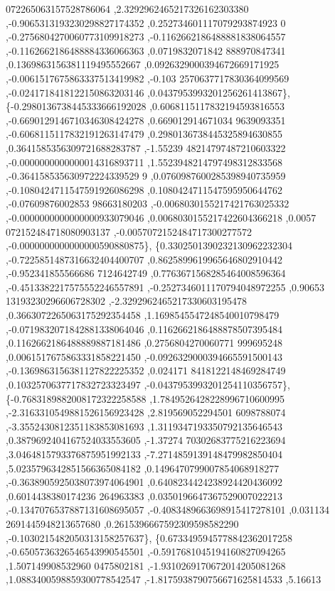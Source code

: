 \begin{DoxyCode}
      072265063157528786064 ,2.3292962465217326162303380 ,-0.9065313193230298827174352 ,0.252734601117079293874923
      0 ,-0.2756804270060773109918273 ,-0.1162662186488881838064557 ,-0.1162662186488884336066363 ,0.0719832071842
      888970847341 ,0.1369863156381119495552667 ,0.0926329000394672669171925 ,-0.0061517675863337513419982 ,-0.103
      2570637717830364099569 ,-0.0241718418122150863203146 ,0.0437953993201256261413867\},
\{-0.2980136738445333666192028 ,0.6068115117832194593816553 ,-0.6690129146710346308424278 ,0.669012914671034
      9639093351 ,-0.6068115117832191263147479 ,0.2980136738445325894630855 ,0.3641585356309721688283787 ,-1.55239
      48214797487210603322 ,-0.0000000000000014316893711 ,1.5523948214797498312833568 ,-0.364158535630972224339529
      9 ,0.0760987600285398940735959 ,-0.1080424711547591926086298 ,0.1080424711547595950644762 ,-0.07609876002853
      98663180203 ,-0.0068030155217421763025332 ,-0.0000000000000000933079046 ,0.0068030155217422604366218 ,0.0057
      072152484718080903137 ,-0.0057072152484717300277572 ,-0.0000000000000000590880875\},
\{0.3302501390232130962232304 ,-0.7225851487316632404400707 ,0.8625899619965646802910442 ,-0.952341855566686
      7124642749 ,0.7763671568285464008596364 ,-0.4513382217575552246557891 ,-0.2527346011170794048972255 ,0.90653
      13193230296606728302 ,-2.3292962465217330603195478 ,0.3663072265063175292354458 ,1.1698545547248540010798479
       ,-0.0719832071842881338064046 ,0.1162662186488878507395484 ,0.1162662186488889887181486 ,0.2756804270060771
      999695248 ,0.0061517675863331858221450 ,-0.0926329000394665591500143 ,-0.1369863156381127822225352 ,0.024171
      8418122148469284749 ,0.1032570637717832723323497 ,-0.0437953993201254110356757\},
\{-0.7683189882008172322258588 ,1.7849526428228996710600995 ,-2.3163310549881526156923428 ,2.819569052294501
      6098788074 ,-3.3552430812351183853081693 ,1.3119347193350792135646543 ,0.3879692404167524033553605 ,-1.37274
      70302683775216223694 ,3.0464815793376875951992133 ,-7.2714859139148479982850404 ,5.0235796342851566365084182
       ,0.1496470799007854068918277 ,-0.3638905925038073974064901 ,0.6408234424238924420436092 ,0.6014438380174236
      264963383 ,0.0350196647367529007022213 ,-0.1347076537887131608695057 ,-0.4083489663698915417278101 ,0.031134
      2691445948213657680 ,0.2615396667592309598582290 ,-0.1030215482050313158257637\},
\{0.6733495945778842362017258 ,-0.6505736326546543990545501 ,-0.5917681045194160827094265 ,1.507149908532960
      0475802181 ,-1.9310269170672014205081268 ,1.0883400598859300778542547 ,-1.8175938790756671625814533 ,5.16613

\end{DoxyCode}
